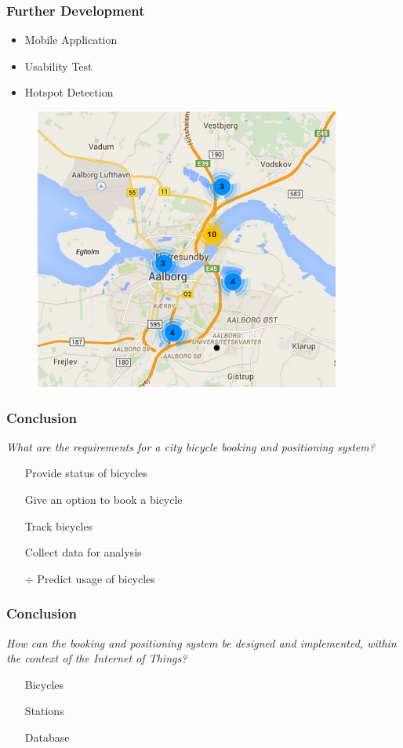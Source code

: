 \begin{frame}
\frametitle{Further Development}
\begin{itemize}
	\item Mobile Application
	\item Usability Test
	\item Hotspot Detection
\end{itemize}
\begin{figure}
\centering
\includegraphics[scale=0.5]{MarkerClusterer}
\end{figure}
\end{frame}

\begin{frame}
\frametitle{Conclusion}
\begin{center}
	\textit{What are the requirements for a city bicycle booking and positioning system?}
\end{center}

\begin{itemize}
	\item[\color{green}\checkmark] Provide status of bicycles
	\item[\color{green}\checkmark] Give an option to book a bicycle
	\item[\color{green}\checkmark] Track bicycles
	\item[\color{green}\checkmark] Collect data for analysis
	\item[\color{red}$\div$] Predict usage of bicycles
\end{itemize}
\end{frame}

\begin{frame}
	\frametitle{Conclusion}
	\begin{center}
		\textit{How can the booking and positioning system be designed and implemented, within the context of the Internet of Things?}
	\end{center}

\begin{itemize}
	\item[\color{green}\checkmark] Bicycles
	\item[\color{green}\checkmark] Stations
	\item[\color{green}\checkmark] Database
\end{itemize}
\end{frame}

